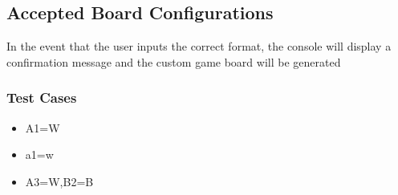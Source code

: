 \documentclass{article}
\begin{document}
\subsection{Accepted Board Configurations}
In the event that the user inputs the correct format, the console will display a confirmation message and the custom game board will be generated 

\subsubsection{Test Cases}
\begin{itemize}
\item A1=W
\item a1=w
\item A3=W,B2=B
\end{itemize}
\end{document}
